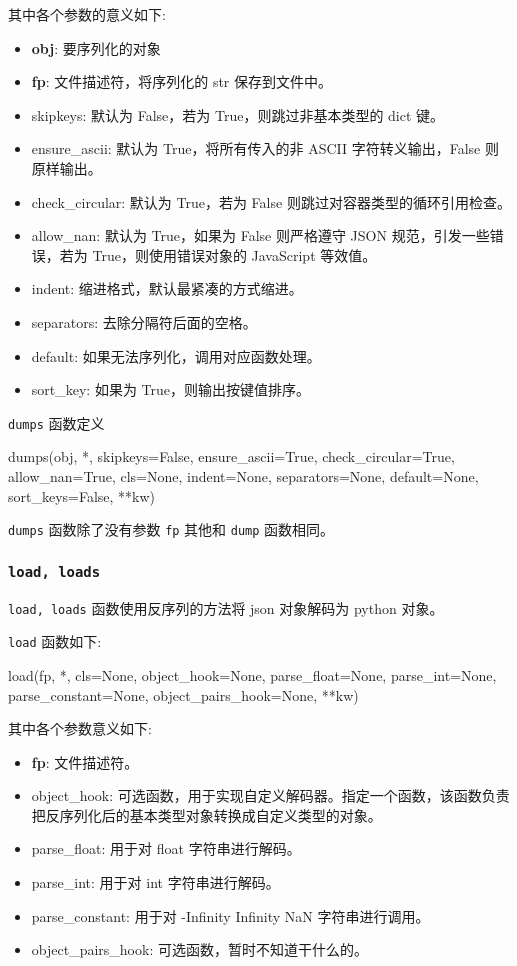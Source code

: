 其中各个参数的意义如下:
\begin{itemize}
    \item \textbf{obj}: 要序列化的对象
    \item \textbf{fp}: 文件描述符，将序列化的 str 保存到文件中。
    \item skipkeys: 默认为 False，若为 True，则跳过非基本类型的 dict 键。
    \item ensure\_ascii: 默认为 True，将所有传入的非 ASCII 字符转义输出，False 则原样输出。
    \item check\_circular: 默认为 True，若为 False 则跳过对容器类型的循环引用检查。
    \item allow\_nan: 默认为 True，如果为 False 则严格遵守 JSON 规范，引发一些错误，若为 True，则使用错误对象的  JavaScript 等效值。
    \item indent: 缩进格式，默认最紧凑的方式缩进。
    \item separators: 去除分隔符后面的空格。
    \item default: 如果无法序列化，调用对应函数处理。
    \item sort\_key: 如果为 True，则输出按键值排序。
\end{itemize}

\texttt{dumps} 函数定义 
\begin{python}
dumps(obj, *, skipkeys=False, ensure_ascii=True, check_circular=True, allow_nan=True, cls=None, indent=None, separators=None, default=None, sort_keys=False, **kw)
\end{python}

\texttt{dumps} 函数除了没有参数 \texttt{fp} 其他和 \texttt{dump} 函数相同。

\subsubsection{\texttt{load, loads}}

\texttt{load, loads} 函数使用反序列的方法将 json 对象解码为 python 对象。

\texttt{load} 函数如下:

\begin{python}
load(fp, *, cls=None, object_hook=None, parse_float=None, parse_int=None, parse_constant=None, object_pairs_hook=None, **kw)
\end{python}

其中各个参数意义如下:

\begin{itemize}
    \item \textbf{fp}: 文件描述符。
    \item object\_hook: 可选函数，用于实现自定义解码器。指定一个函数，该函数负责把反序列化后的基本类型对象转换成自定义类型的对象。
    \item parse\_float: 用于对 float 字符串进行解码。
    \item parse\_int: 用于对 int 字符串进行解码。
    \item parse\_constant: 用于对 -Infinity Infinity NaN 字符串进行调用。
    \item object\_pairs\_hook: 可选函数，暂时不知道干什么的。
\end{itemize}

